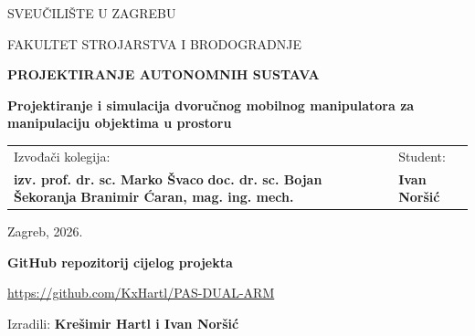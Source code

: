 \documentclass[12pt,a4paper]{article}
\newcommand{\univname}{SVEUČILIŠTE U ZAGREBU}
\newcommand{\facultyname}{FAKULTET STROJARSTVA I BRODOGRADNJE}
\newcommand{\coursename}{PROJEKTIRANJE AUTONOMNIH SUSTAVA}
\newcommand{\seminartitle}{Projektiranje i simulacija dvoručnog mobilnog manipulatora za manipulaciju objektima u prostoru}
\newcommand{\professorlabel}{Izvođači kolegija:}
\newcommand{\professorname}{%
  \textbf{izv. prof. dr. sc. Marko Švaco}\newline
  \textbf{doc. dr. sc. Bojan Šekoranja}\newline
  \textbf{Branimir Ćaran, mag. ing. mech.}}
\newcommand{\authorname}{Ivan Noršić}
\newcommand{\locationdate}{Zagreb, 2026.}
\newcommand{\repourl}{\url{https://github.com/KxHartl/PAS-DUAL-ARM}}
\begin{document}
\hypersetup{pageanchor=false}

\begin{titlepage}
  \centering
  {\fontsize{14}{17}\selectfont \univname \par}
  {\fontsize{14}{17}\selectfont \facultyname \par}
  \vfill
  {\fontsize{28}{34}\bfseries \coursename \par}
  \vspace{0.8cm}
  {\fontsize{14}{18}\bfseries \seminartitle \par}
  \vfill
  \begin{tabular}{>{\raggedright\arraybackslash}p{}>{\raggedleft\arraybackslash}p{}}
    \textmd{\professorlabel} & \textmd{Student:} \\[0.3cm]
    \professorname & \textbf{\authorname}
  \end{tabular}
  \vspace{1.5cm}
  \par
  {\normalfont \locationdate \par}
\end{titlepage}

\thispagestyle{empty}
\vspace*{\fill}
\begin{center}
  {\fontsize{16}{20}\selectfont\bfseries GitHub repozitorij cijelog projekta\par}
  \vspace{1cm}
  {\Large \repourl\par}
  \vspace{1cm}
  {\large Izradili: \textbf{Krešimir Hartl i Ivan Noršić}\par}
\end{center}
\vspace*{\fill}
\clearpage
\hypersetup{pageanchor=true}

\setcounter{page}{1}

\tableofcontents
\clearpage
\listoffigures\clearpage
\listoftables\clearpage
\lstlistoflistings\clearpage

\setcounter{page}{1}












\clearpage


\end{document}
